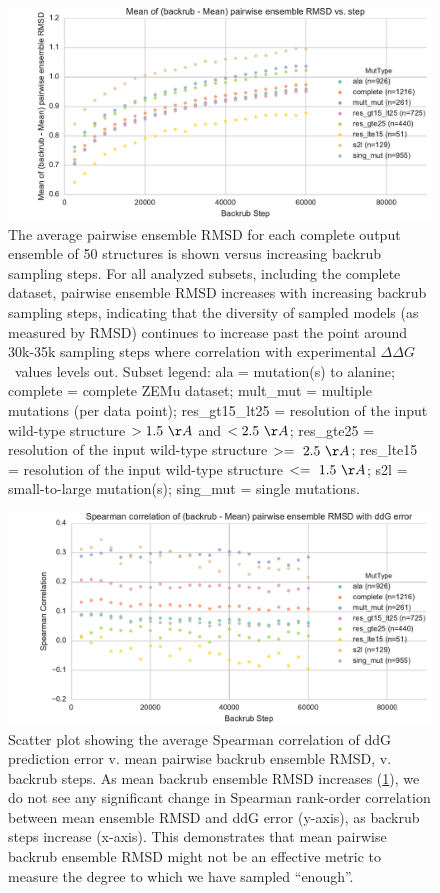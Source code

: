 \documentclass{article}
\newcommand\ddg{$\Delta\Delta G$}
\begin{document}
\begin{figure}
  \centering
  \includegraphics[width=\textwidth,keepaspectratio]{figures/t14-mean-ensemble-error.pdf}
  \caption{
    The average pairwise ensemble RMSD for each complete output ensemble of 50 structures is shown versus increasing backrub sampling steps. For all analyzed subsets, including the complete dataset, pairwise ensemble RMSD increases with increasing backrub sampling steps, indicating that the diversity of sampled models (as measured by RMSD) continues to increase past the point around 30k-35k sampling steps where correlation with experimental \ddg\ values levels out. Subset legend: ala = mutation(s) to alanine; complete = complete ZEMu dataset; mult\_mut = multiple mutations (per data point); res\_gt15\_lt25 = resolution of the input wild-type structure $> 1.5\ \AA$ and $< 2.5\ \AA$; res\_gte25 = resolution of the input wild-type structure $>=\ 2.5\ \AA$; res\_lte15 = resolution of the input wild-type structure $<=\ 1.5\ \AA$; s2l = small-to-large mutation(s); sing\_mut = single mutations.
  } \label{fig:t14-mean-ensemble}
\end{figure}

\begin{figure}
  \centering
  \includegraphics[width=\textwidth,keepaspectratio]{figures/t14-spear-corr.pdf}
  \caption[\ddg\ prediction error vs. ensemble RMSD]{
    Scatter plot showing the average Spearman correlation of ddG prediction error v. mean pairwise backrub ensemble RMSD, v. backrub steps.
    As mean backrub ensemble RMSD increases (\cref{fig:t14-mean-ensemble}), we do not see any significant change in Spearman rank-order correlation between mean ensemble RMSD and ddG error (y-axis), as backrub steps increase (x-axis).
    This demonstrates that mean pairwise backrub ensemble RMSD might not be an effective metric to measure the degree to which we have sampled ``enough''.
  } \label{fig:spear-corr-rmsd-error}
\end{figure}
\end{document}

